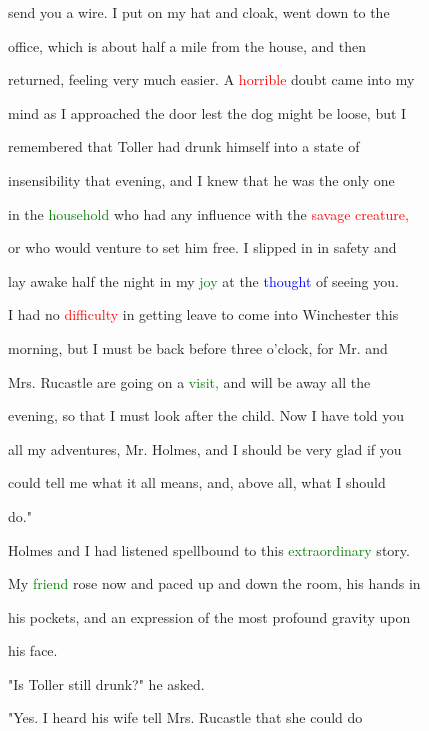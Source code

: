  send you a wire. I put on my hat and cloak, went down to the

 office, which is about half a mile from the house, and then

 returned, feeling very much easier. A \textcolor{red}{horrible} \textcolor{BurntOrange}{doubt} came into my

 mind as I approached the door lest the dog might be loose, but I

 remembered that Toller had drunk himself into a state of

 insensibility that evening, and I knew that he was the only one

 in the \textcolor{green}{household} who had any \textcolor{BurntOrange}{influence} with the \textcolor{red}{savage} \textcolor{red}{creature,}

 or who would venture to set him free. I \textcolor{BurntOrange}{slipped} in in safety and

 lay awake half the night in my \textcolor{green}{joy} at the \textcolor{blue}{thought} of seeing you.

 I had no \textcolor{red}{difficulty} in getting \textcolor{BurntOrange}{leave} to come into Winchester this

 morning, but I must be back before three o'clock, for Mr. and

 Mrs. Rucastle are going on a \textcolor{green}{visit,} and will be away all the

 evening, so that I must look after the \textcolor{BurntOrange}{child.} Now I have told you

 all my \textcolor{BurntOrange}{adventures,} Mr. Holmes, and I should be very \textcolor{BurntOrange}{glad} if you

 could tell me what it all means, and, above all, what I should

 do."



 Holmes and I had listened spellbound to this \textcolor{green}{extraordinary} story.

 My \textcolor{green}{friend} rose now and paced up and down the room, his hands in

 his pockets, and an expression of the most profound gravity upon

 his face.



 "Is Toller still drunk?" he asked.



 "Yes. I heard his wife tell Mrs. Rucastle that she could do

